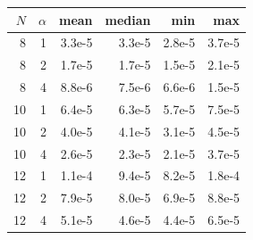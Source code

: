 \begin{tabular}{rrrrrr}\toprule
$N$ & $\alpha$ & mean & median & min & max \\\midrule
8 & 1 & 3.3e-5 & 3.3e-5 & 2.8e-5 & 3.7e-5 \\
8 & 2 & 1.7e-5 & 1.7e-5 & 1.5e-5 & 2.1e-5 \\
8 & 4 & 8.8e-6 & 7.5e-6 & 6.6e-6 & 1.5e-5 \\
10 & 1 & 6.4e-5 & 6.3e-5 & 5.7e-5 & 7.5e-5 \\
10 & 2 & 4.0e-5 & 4.1e-5 & 3.1e-5 & 4.5e-5 \\
10 & 4 & 2.6e-5 & 2.3e-5 & 2.1e-5 & 3.7e-5 \\
12 & 1 & 1.1e-4 & 9.4e-5 & 8.2e-5 & 1.8e-4 \\
12 & 2 & 7.9e-5 & 8.0e-5 & 6.9e-5 & 8.8e-5 \\
12 & 4 & 5.1e-5 & 4.6e-5 & 4.4e-5 & 6.5e-5 \\
\bottomrule\end{tabular}
